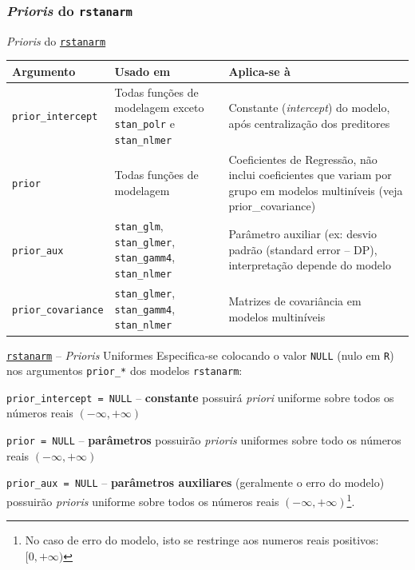 \subsubsection{\textit{Prioris} do \texttt{rstanarm}}
\begin{frame}{\textit{Prioris} do \href{http://mc-stan.org/rstanarm/}{\texttt{rstanarm}}}
    \footnotesize
    \begin{tabular}{|l|p{}|p{}|}
        \toprule
        \textbf{Argumento}         & \textbf{Usado em}                                                                    & \textbf{Aplica-se à}                                                                                                     \\ \midrule
        \texttt{prior\_intercept}  & Todas funções de modelagem exceto \texttt{stan\_polr} e \texttt{stan\_nlmer}         & Constante (\textit{intercept}) do modelo, após centralização dos preditores                                              \\ \midrule
        \texttt{prior}             & Todas funções de modelagem                                                           & Coeficientes de Regressão, não inclui coeficientes que variam por grupo em modelos multiníveis (veja prior\_covariance)  \\ \midrule
        \texttt{prior\_aux}        & \texttt{stan\_glm}, \texttt{stan\_glmer}, \texttt{stan\_gamm4}, \texttt{stan\_nlmer} & Parâmetro auxiliar (ex: desvio padrão (standard error – DP), interpretação depende do modelo                             \\ \midrule
        \texttt{prior\_covariance} & \texttt{stan\_glmer}, \texttt{stan\_gamm4}, \texttt{stan\_nlmer}                     & Matrizes de covariância em modelos multiníveis                                                                           \\
        \bottomrule
    \end{tabular}
\end{frame}

\begin{frame}{\href{http://mc-stan.org/rstanarm/}{\texttt{rstanarm}} -- \textit{Prioris} Uniformes}
    Especifica-se colocando o valor \lstinline!NULL! (nulo em \texttt{R}) nos argumentos
    \lstinline!prior_*! dos modelos \texttt{rstanarm}:
    \begin{vfilleditems}
        \item \lstinline!prior_intercept = NULL! -- \textbf{constante} possuirá \textit{priori} uniforme sobre todos os números reais $(-\infty, +\infty)$
        \item \lstinline!prior = NULL! -- \textbf{parâmetros} possuirão \textit{prioris} uniformes sobre todo os números reais $(-\infty, +\infty)$
        \item \lstinline!prior_aux = NULL! -- \textbf{parâmetros auxiliares} (geralmente o erro do modelo) possuirão \textit{prioris} uniforme sobre todos os números reais $(-\infty, +\infty)$\footnote{No caso de erro do modelo, isto se restringe aos numeros reais positivos: $[0, +\infty)$}.
    \end{vfilleditems}
\end{frame}

